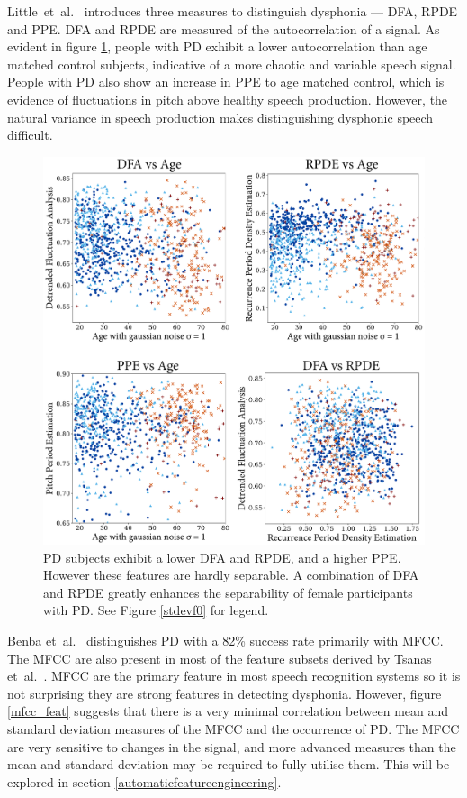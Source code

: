 \documentclass[12pt, twoside]{book}
\begin{document}
Little~et~al.~\cite{splittlenonlinear2007,splittledysphonia2009} introduces three measures to distinguish dysphonia --- DFA, RPDE and PPE. DFA and RPDE are measured of the autocorrelation of a signal. As evident in figure \ref{dfapperpde}, people with PD exhibit a lower autocorrelation than age matched control subjects, indicative of a more chaotic and variable speech signal. People with PD also show an increase in PPE to age matched control, which is evidence of fluctuations in pitch above healthy speech production. However, the natural variance in speech production makes distinguishing dysphonic speech difficult.


\begin{figure}[h]
	\caption{PD subjects exhibit a lower DFA and RPDE, and a higher PPE. However these features are hardly separable. A combination of DFA and RPDE greatly enhances the separability of female participants with PD. See Figure \ref{stdevf0} for legend.}
	\label{dfapperpde}
	\centering\centerline{\includegraphics[width=0.8\linewidth]{dfapperpde.png}}
\end{figure}


Benba et~al.~\cite{benba2014mfcc} distinguishes PD with a 82\% success rate primarily with MFCC. The MFCC are also present in most of the feature subsets derived by Tsanas et~al.~\cite{tsanas2012novel}. MFCC are the primary feature in most speech recognition systems so it is not surprising they are strong features in detecting dysphonia. However, figure \ref{mfcc_feat} suggests that there is a very minimal correlation between mean and standard deviation measures of the MFCC and the occurrence of PD. The MFCC are very sensitive to changes in the signal, and more advanced measures than the mean and standard deviation may be required to fully utilise them. This will be explored in section \ref{automaticfeatureengineering}.
\end{document}
